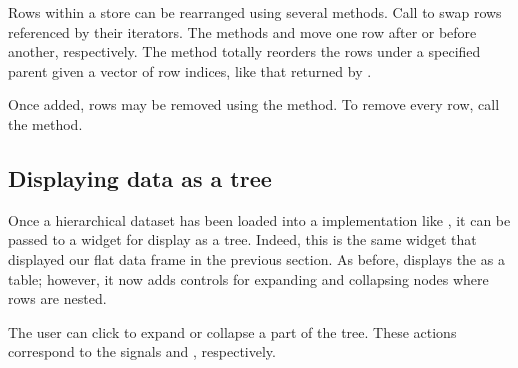 Rows within a store can be rearranged using several methods. Call
 to swap rows referenced by their
iterators.  The methods  and
 move one row after or before
another, respectively.  The  method
totally reorders the rows under a specified parent given a vector of
row indices, like that returned by .

Once added, rows may be removed using the
 method. To remove every row, call the
 method.

\subsection{Displaying data as a tree}
\label{sec:RGtk2:mvc:display-tree}

Once a hierarchical dataset has been loaded into a
 implementation like , it can
be passed to a  widget for display as a
tree. Indeed, this is the same widget that displayed our flat data
frame in the previous section. As before, 
displays the  as a table; however, it now adds
controls for expanding and collapsing nodes where rows are nested.

The user can click to expand or collapse a part of the tree. These
actions correspond to the signals  and
, respectively.

